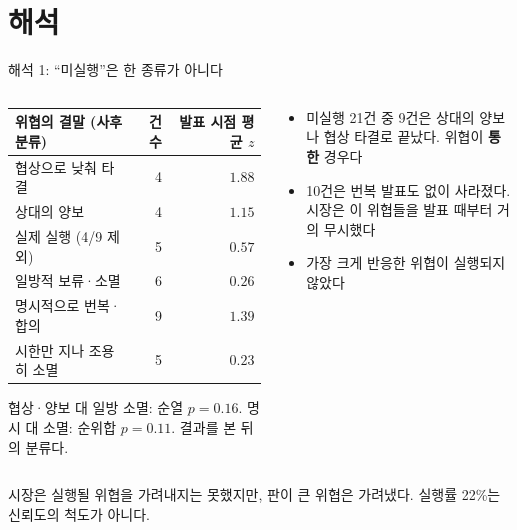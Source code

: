 \documentclass[aspectratio=169,9pt,t]{beamer}
\newcommand{\takeaway}[1]{%
  \par\vfill
  \noindent{\color{navy}\vrule width 1.6pt}\hspace{2.6mm}%
  \begin{minipage}[c]{\dimexpr\linewidth-5mm\relax}\small\linespread{1.15}\selectfont\RaggedRight #1\end{minipage}\par\vspace{1.2mm}}
\newcommand{\tf}{\fontsize{8.2}{10.4}\selectfont}
\begin{document}
\section{해석}

\begin{frame}{해석 1: ``미실행''은 한 종류가 아니다}
\begin{columns}[c,onlytextwidth]
\begin{column}{0.54\textwidth}
\begingroup\tf
\begin{tabularx}{\linewidth}{@{}Yrr@{}}
\toprule
위협의 결말 (사후 분류) & 건수 & 발표 시점 평균 $z$\\
\midrule
협상으로 낮춰 타결 & 4 & $1.88$\\
상대의 양보 & 4 & $1.15$\\
실제 실행 (4/9 제외) & 5 & $0.57$\\
일방적 보류·소멸 & 6 & $0.26$\\
\midrule
명시적으로 번복·합의 & 9 & $1.39$\\
시한만 지나 조용히 소멸 & 5 & $0.23$\\
\bottomrule
\end{tabularx}\endgroup
\vspace{1.5mm}
{\small\RaggedRight 협상·양보 대 일방 소멸: 순열 $p=0.16$. 명시 대 소멸: 순위합 $p=0.11$. 결과를 본 뒤의 분류다.\par}
\end{column}
\begin{column}{0.42\textwidth}
\begin{itemize}
\item 미실행 21건 중 9건은 상대의 양보나 협상 타결로 끝났다. 위협이 \textbf{통한} 경우다
\item 10건은 번복 발표도 없이 사라졌다. 시장은 이 위협들을 발표 때부터 거의 무시했다
\item 가장 크게 반응한 위협이 실행되지 않았다
\end{itemize}
\end{column}
\end{columns}
\takeaway{시장은 실행될 위협을 가려내지는 못했지만, 판이 큰 위협은 가려냈다. 실행률 22\%는 신뢰도의 척도가 아니다.}
\end{frame}
\end{document}
